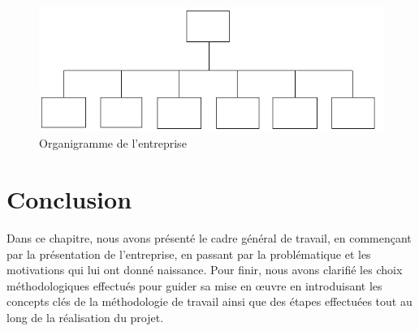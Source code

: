 \begin{spacing}{1.5}
\begin{figure}[h]
\centering
\includegraphics[width=0.8\linewidth]{organigramme.jpg}
\caption{Organigramme de l'entreprise}
\label{fig:gantt}
\end{figure}


\section*{Conclusion}
Dans ce chapitre, nous avons présenté le cadre général de travail, en commençant par la présentation de l'entreprise, en passant par la problématique et les motivations qui lui ont donné naissance. Pour finir, nous avons clarifié les choix méthodologiques effectués pour guider sa mise en œuvre en introduisant les concepts clés de la méthodologie de travail ainsi que des étapes effectuées tout au long de la réalisation du projet.


\end{spacing}
